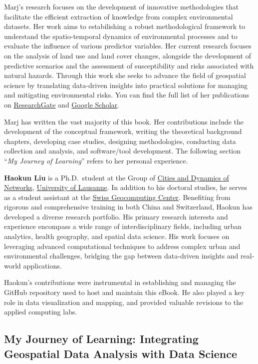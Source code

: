 \documentclass[
]{article}
\begin{document}
Marj's research focuses on the development of innovative methodologies that facilitate the efficient extraction of knowledge from complex environmental datasets.
Her work aims to estabilishing a robust methodological framework to understand the spatio-temporal dynamics of environmental processes and to evaluate the influence of various predictor variables.
Her current research focuses on the analysis of land use and land cover changes, alongside the development of predictive scenarios and the assessment of susceptibility and risks associated with natural hazards.
Through this work she seeks to advance the field of geospatial science by translating data-driven insights into practical solutions for managing and mitigating environmental risks.
You can find the full list of her publications on \href{https://www.researchgate.net/profile/Marj-Tonini-2}{ResearchGate} and \href{https://scholar.google.it/citations?user=qXexP-IAAAAJ&hl=en}{Google Scholar}.

Marj has written the vast majority of this book.
Her contributions include the development of the conceptual framework, writing the theoretical background chapters, developing case studies, designing methodologies, conducting data collection and analysis, and software/tool development.
The following section ``\emph{My Journey of Learning}'' refers to her personal experience.

\textbf{Haokun Liu} is a Ph.D.~student at the Group of \href{https://wp.unil.ch/citadyne-news/}{Cities and Dynamics of Networks}, \href{https://www.unil.ch/central/en/home.html}{University of Lausanne}.
In addition to his doctoral studies, he serves as a student assistant at the \href{https://unil-sgc.github.io/}{Swiss Geocomputing Center}.
Benefiting from rigorous and comprehensive training in both China and Switzerland, Haokun has developed a diverse research portfolio.
His primary research interests and experience encompass a wide range of interdisciplinary fields, including urban analytics, health geography, and spatial data science.
His work focuses on leveraging advanced computational techniques to address complex urban and environmental challenges, bridging the gap between data-driven insights and real-world applications.

Haokun's contributions were instrumental in establishing and managing the GitHub repository used to host and maintain this eBook.
He also played a key role in data visualization and mapping, and provided valuable revisions to the applied computing labs.

\subsection*{My Journey of Learning: Integrating Geospatial Data Analysis with Data Science}\label{my-journey-of-learning-integrating-geospatial-data-analysis-with-data-science}
\end{document}
